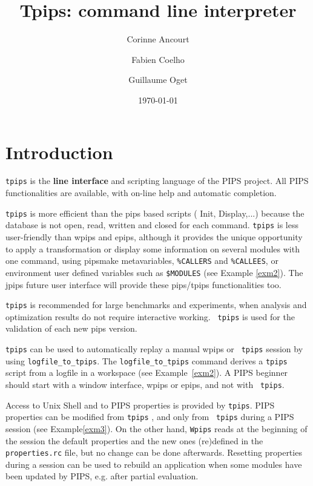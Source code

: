 \documentclass[a4paper,12pt]{article}
\title{Tpips: command line interpreter}
\author{Corinne Ancourt \and Fabien Coelho \and Guillaume Oget}
\date{\today}
\begin{document}
\setlength{\parindent}{0in}

\maketitle


\tableofcontents

\section{Introduction}


{\tt tpips} is the {\bf line interface} and scripting language of the
PIPS project. All PIPS functionalities are available, with
on-line help and automatic completion.

{\tt tpips} is more efficient than the pips based scripts ( Init,
Display,...) because the database is not open, read, written and closed
for each command. {\tt tpips} is less user-friendly than wpips and epips,
although it provides the unique opportunity to apply a transformation or
display some information on several modules with one command, using
pipsmake metavariables, 
\verb+%CALLERS+ and  \verb+%CALLEES+,  
or environment  user defined variables such
as \verb+$MODULES+ %
(see Example \ref{exm2}). The jpips future user
interface will provide these pips/tpips functionalities too.

{\tt tpips} is recommended for large benchmarks and experiments, when
analysis and optimization results do not require interactive working. {\tt
  tpips} is used for the validation of each new pips version.

{\tt tpips} can be used to automatically replay a manual wpips or {\tt
  tpips} session by using \verb+logfile_to_tpips+. The
\verb+logfile_to_tpips+ command derives a {\tt tpips} script
from a logfile in a workspace (see Example~\ref{exm2}). A PIPS beginner
should start with a window interface, wpips or epips, and not with {\tt
  tpips}.


Access to Unix Shell and to PIPS properties is provided by {\tt tpips}.
PIPS properties can be modified from {\tt tpips} , and only from {\tt
  tpips} during a PIPS session (see Example\ref{exm3}). On the other hand,
{\tt Wpips} reads at the
beginning of the session the default properties and the new ones
(re)defined in the {\tt properties.rc} file, but no change can be done
afterwards.  Resetting properties during a session can be used to rebuild
an application when some modules have been updated by PIPS, e.g. after
partial evaluation.
\end{document}
